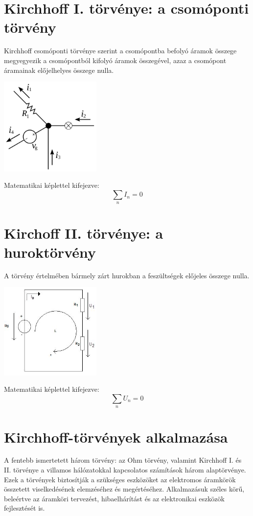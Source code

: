 \documentclass{article}
\begin{document}
\section{Kirchhoff I. törvénye: a csomóponti törvény}
Kirchhoff csomóponti törvénye szerint a csomópontba befolyó áramok összege megyegyezik a csomópontból kifolyó áramok összegével, azaz a csomópont áramainak előjelhelyes összege nulla. 

\includegraphics[width=5cm, center]{kirchoff1}

Matematikai képlettel kifejezve:
\begin{equation}
    \sum_{n} I_n = 0
\end{equation}

\section{Kirchoff II. törvénye: a huroktörvény}
A törvény értelmében bármely zárt hurokban a feszültségek előjeles összege nulla.

\includegraphics[width=5cm, center]{kirchoff2}

Matematikai képlettel kifejezve:
\begin{equation}
    \sum_{n} U_n = 0
\end{equation}

\section{Kirchhoff-törvények alkalmazása}
A fentebb ismertetett három törvény: az Ohm törvény, valamint Kirchhoff I. és II. törvénye a villamos hálózatokkal kapcsolatos számítások három alaptörvénye. Ezek a törvények biztosítják a szükséges eszközöket az elektromos áramkörök összetett viselkedésének elemzéséhez és megértéséhez. Alkalmazásuk széles körű, beleértve az áramköri tervezést, hibaelhárítást és az elektronikai eszközök fejlesztését is.
\end{document}
